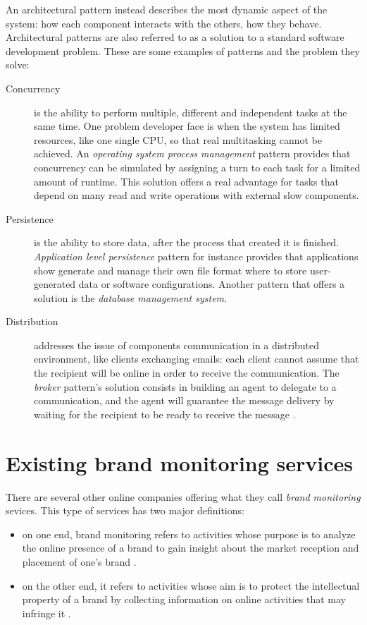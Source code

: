 An architectural pattern instead describes the most dynamic aspect of the
system: how each component interacts with the others, how they behave.
Architectural patterns are also referred to as a solution to a standard software
development problem. These are some examples of patterns and the problem they
solve:
\begin{description}
\item[Concurrency] is the ability to perform multiple, different and
independent tasks at the same time. One problem developer face is when the
system has limited resources, like one single CPU, so that real multitasking
cannot be achieved. An \emph{operating system process management} pattern
provides that concurrency can be simulated by assigning a turn to each task for
a limited amount of runtime. This solution offers a real advantage for tasks
that depend on many read and write operations with external slow components.
\item[Persistence] is the ability to store data, after the process that created
it is finished. \emph{Application level persistence} pattern for instance
provides that applications show generate and manage their own file format where
to store user-generated data or software configurations. Another pattern that
offers a solution is the \emph{database management system}.
\item[Distribution] addresses the issue of components communication in a
distributed environment, like clients exchanging emails: each client cannot
assume that the recipient will be online in order to receive the communication.
The \emph{broker} pattern's solution consists in building an agent to delegate
to a communication, and the agent will guarantee the message delivery by waiting
for the recipient to be ready to receive the message \cite{JB00}.
\end{description}

\section{Existing brand monitoring services}
There are several other online companies offering what they call \emph{brand
monitoring} sevices. This type of services has two major definitions:
\begin{itemize}
  \item on one end, brand monitoring refers to activities whose purpose is to
  analyze the online presence of a brand to gain insight about the market
  reception and placement of one's brand \cite{techpd}.
  \item on the other end, it refers to activities whose aim is to protect the
  intellectual property of a brand by collecting information on online
  activities that may infringe it \cite{cscbrand}.
\end{itemize}

